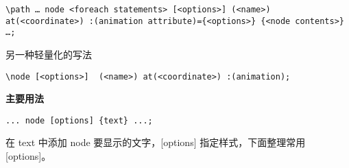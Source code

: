 \begin{lstlisting}[style = latex]
    \path … node <foreach statements> [<options>] (<name>) at(<coordinate>) :(animation attribute)={<options>} {<node contents>} …;
\end{lstlisting}

\noindent 另一种轻量化的写法

\begin{lstlisting}[style = latex]
    \node [<options>]  (<name>) at(<coordinate>) :(animation);
\end{lstlisting}


\noindent\textbf{主要用法} 
\begin{lstlisting}[style = latex]
    ... node [options] {text} ...;
\end{lstlisting}

\noindent 在 {text} 中添加 node 要显示的文字，[options] 指定样式，下面整理常用 [options]。


